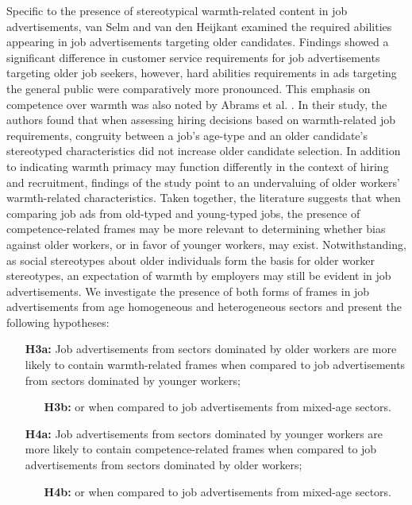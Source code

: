 \documentclass[Royal,sageapa,times]{sagej}
\begin{document}
Specific to the presence of stereotypical warmth-related content in job advertisements, van Selm and van den Heijkant \citeyear{vanselmSearchOlderWorker2021} examined the required abilities appearing in job advertisements targeting older candidates. Findings showed a significant difference in customer service requirements for job advertisements targeting older job seekers, however, hard abilities requirements in ads targeting the general public were comparatively more pronounced. This emphasis on competence over warmth was also noted by Abrams et al. \citeyear{abramsOldUnemployableHow2016}. In their study, the authors found that when assessing hiring decisions based on warmth-related job requirements, congruity between a job’s age-type and an older candidate’s stereotyped characteristics did not increase older candidate selection. In addition to indicating warmth primacy may function differently in the context of hiring and recruitment, findings of the study point to an undervaluing of older workers’ warmth-related characteristics. Taken together, the literature suggests that when comparing job ads from old-typed and young-typed jobs, the presence of competence-related frames may be more relevant to determining whether bias against older workers, or in favor of younger workers, may exist. Notwithstanding, as social stereotypes about older individuals form the basis for older worker stereotypes, an expectation of warmth by employers may still be evident in job advertisements. We investigate the presence of both forms of frames in job advertisements from age homogeneous and heterogeneous sectors and present the following hypotheses:

\begin{enumerate}
\item[\textbf{H3a:}] Job advertisements from sectors dominated by older workers are more likely to contain warmth-related frames when compared to job advertisements from sectors dominated by younger workers;

\begin{enumerate}
\item[\textbf{H3b:}] or when compared to job advertisements from mixed-age sectors.
\end{enumerate}

\item[\textbf{H4a:}] Job advertisements from sectors dominated by younger workers are more likely to contain competence-related frames when compared to job advertisements from sectors dominated by older workers;

\begin{enumerate}
\item[\textbf{H4b:}] or when compared to job advertisements from mixed-age sectors.

\end{enumerate}
\end{enumerate}
\end{document}

